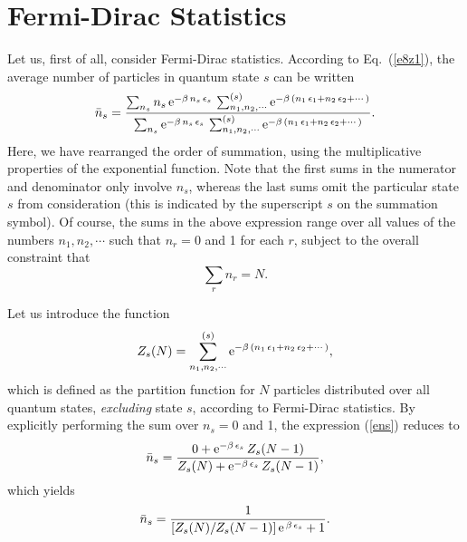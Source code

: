 \section{Fermi-Dirac Statistics}\label{s8fd}
Let us, first of all, consider Fermi-Dirac statistics. According to Eq.~(\ref{e8z1}),
the average number of particles in quantum state $s$ can be written
\begin{equation}
\bar{n}_s = \frac{\sum_{n_s} n_s\,{\rm e}^{-\beta\,n_s\,\epsilon_s}\,
\sum_{n_1,n_2,\cdots}^{(s)} {\rm e}^{-\beta\,(n_1\,\epsilon_1+n_2\,\epsilon_2+
\cdots)}}{\sum_{n_s} {\rm e}^{-\beta\,n_s\,\epsilon_s}\,
\sum_{n_1,n_2,\cdots}^{(s)} {\rm e}^{-\beta\,(n_1\,\epsilon_1+n_2\,\epsilon_2+
\cdots)}}.\label{ens}
\end{equation}
Here, we have rearranged the order of summation, using the multiplicative
properties of the exponential function. Note that the first sums in the
numerator and denominator
only involve $n_s$, whereas the last sums
 omit the particular state $s$ from consideration
(this is indicated by the superscript $s$ on the summation symbol). Of course,
the sums in the above expression range over all values of the
numbers $n_1, n_2, \cdots$ such that $n_r=0$ and 1 for
each $r$, subject to the overall constraint that
\begin{equation}
\sum_r n_r = N.
\end{equation}

Let us introduce the function
\begin{equation}\label{e8zs}
Z_s(N) = \sum_{n_1,n_2,\cdots}^{(s)}
{\rm e}^{-\beta\,(n_1\,\epsilon_1+n_2\,\epsilon_2+
\cdots)},
\end{equation}
which is defined as the partition function for $N$ particles distributed over all
quantum states, {\em excluding}\/ state $s$, according to Fermi-Dirac statistics.
By explicitly performing the sum over $n_s=0$ and 1, the
expression (\ref{ens}) reduces to
\begin{equation}\label{e8da}
\bar{n}_s = \frac{0 + {\rm e}^{-\beta\,\epsilon_s}\,Z_s(N-1)}
{Z_s(N) + {\rm e}^{-\beta\,\epsilon_s}\,Z_s(N-1)},
\end{equation}
which yields
\begin{equation}\label{e8dz}
\bar{n}_s =\frac{1}{[Z_s(N)/Z_s(N-1)]\,{\rm e}^{\,\beta\,\epsilon_s} + 1}.
\end{equation}


